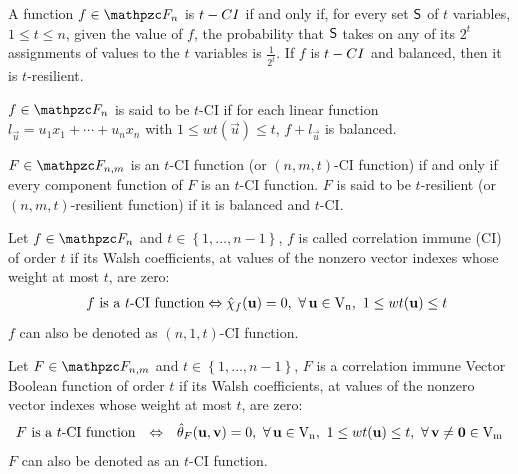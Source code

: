 \begin{definition}
A function $f \in \funct{F}_{n}$ is $t-\crit{CI}$ if and only if, for every set $\set{S}$ of $t$ variables, $1 \leq t \leq n$, given the value of $f$, the probability that $\set{S}$  takes on any of its $2^t$ assignments of values to the $t$ variables is $\frac{1}{2^t}$. If $f$ is $t-\crit{CI}$ and balanced, then it is $t$-resilient.
\end{definition}

\begin{definition}\cite{XiaoM:88}
$f \in \funct{F}_n$ is said to be $t$-CI if for each linear function $l_{\vec{u}}=u_1x_1+\dotsb+u_nx_n$ with $1 \leq wt(\vec{u}) \leq t$, $f+l_{\vec{u}}$ is balanced.
\end{definition}

\begin{definition}\cite{Chen:02}
$F \in \funct{F}_{n,m}$ is an $t$-CI function (or $(n,m,t)$-CI function) if and only if every component function of $F$ is an $t$-CI function. $F$ is said to be $t$-resilient (or $(n,m,t)$-resilient function) if it is balanced and $t$-CI. 
\end{definition}

\begin{theorem}\cite{XiaoM:88}
Let $f \in \funct{F}_n$ and $t \in \left\{1,\dots,n-1\right\}$, $f$ is called correlation immune (CI) of order $t$ if its Walsh coefficients, at values of the nonzero vector indexes whose weight at most $t$, are zero:
\begin{equation}
\begin{array}{ll}
&f \mbox{ is a }t\mbox{-CI function} \Leftrightarrow \walsh{\chi}_f(\vec{u}) = 0, \ \fa \vec{u} \in \gf{V_n}, \ 1 \leq wt(\vec{u}) \leq t 
\end{array}
\end{equation}
$f$ can also be denoted as $(n,1,t)$-CI function.
\end{theorem}

\begin{theorem}
Let $F \in \funct{F}_{n,m}$  and $t \in \left\{1,\dots,n-1\right\}$, $F$ is a correlation immune Vector Boolean function of order $t$ if its Walsh coefficients, at values of the nonzero vector indexes whose weight at most $t$, are zero:
\begin{equation}
\begin{array}{rcl}
F \mbox{ is a }t\mbox{-CI function}&\Leftrightarrow& \walsh{\theta}_F(\vec{u},\vec{v})= 0, \ \fa \vec{u} \in \gf{V_n}, \ 1 \leq wt(\vec{u}) \leq t, \ \fa \vec{v} \neq \vec{0} \in \gf{V_m} 
\end{array}
\end{equation}
$F$ can also be denoted as an $t$-CI function.
\end{theorem}

